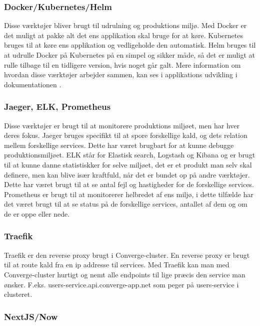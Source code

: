 \subsubsection{Docker/Kubernetes/Helm}

Disse værktøjer bliver brugt til udrulning og produktions miljø. Med Docker er det muligt at pakke alt det ens applikation skal bruge for at køre. Kubernetes bruges til at køre ens applikation og vedligeholde den automatisk. Helm bruges til at udrulle Docker på Kubernetes på en simpel og sikker måde, så det er muligt at rulle tilbage til en tidligere version, hvis noget går galt. Mere information om hvordan disse værktøjer arbejder sammen, kan ses i applikations udvikling i dokumentationen .

\subsubsection{Jaeger, ELK, Prometheus}

Disse værktøjer er brugt til at monitorere produktions miljøet, men har hver deres fokus. Jaeger bruges specifikt til at spore forskellige kald, og dets relation mellem forskellige services. Dette har været brugbart for at kunne debugge produktionsmiljøet. ELK står for Elastisk search, Logstash og Kibana og er brugt til at kunne danne statistiskker for selve miljøet, det er et produkt man selv skal definere, men kan blive især kraftfuld, når det er bundet op på andre værktøjer. Dette har været brugt til at se antal fejl og hastigheder for de forskellige services. Prometheus er brugt til at monitorerer helbredet af ens miljø, i dette tilfælde har det været brugt til at se status på de forskellige services, antallet af dem og om de er oppe eller nede.

\subsubsection{Traefik}

Traefik er den reverse proxy brugt i Converge-cluster. En reverse proxy er brugt til at route kald fra en ip addresse til services. Med Traefik kan man med Converge-cluster hurtigt og nemt alle endpoints til lige præcis den service man ønsker. F.eks. users-service.api.converge-app.net som peger på users-service i clusteret.

\subsubsection{NextJS/Now}

